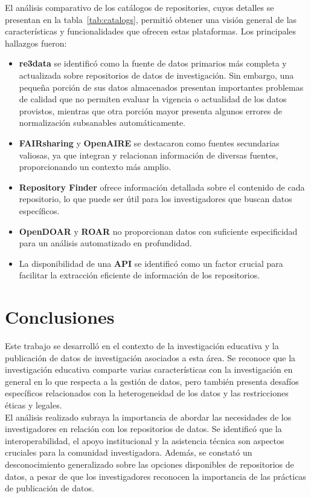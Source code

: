\documentclass[runningheads]{llncs}
\begin{document}
El análisis comparativo de los catálogos de repositories, cuyos detalles se presentan en la tabla~\ref{tab:catalogs}, permitió obtener una visión general de las características y funcionalidades que ofrecen estas plataformas. Los principales hallazgos fueron:
\begin{itemize}
    \item \textbf{re3data} se identificó como la fuente de datos primarios más completa y actualizada sobre repositorios de datos de investigación. Sin embargo, una pequeña porción de sus datos almacenados presentan importantes problemas de calidad que no permiten evaluar la vigencia o actualidad de los datos provistos, mientras que otra porción mayor presenta algunos errores de normalización subsanables automáticamente.
    \item \textbf{FAIRsharing} y \textbf{OpenAIRE} se destacaron como fuentes secundarias valiosas, ya que integran y relacionan información de diversas fuentes, proporcionando un contexto más amplio.
    \item \textbf{Repository Finder} ofrece información detallada sobre el contenido de cada repositorio, lo que puede ser útil para los investigadores que buscan datos específicos.
    \item \textbf{OpenDOAR} y \textbf{ROAR} no proporcionan datos con suficiente especificidad para un análisis automatizado en profundidad.
    \item La disponibilidad de una \textbf{API} se identificó como un factor crucial para facilitar la extracción eficiente de información de los repositorios.
\end{itemize}

\section{Conclusiones}

Este trabajo se desarrolló en el contexto de la investigación educativa y la publicación de datos de investigación asociados a esta área. Se reconoce que la investigación educativa comparte varias características con la investigación en general en lo que respecta a la gestión de datos, pero también presenta desafíos específicos relacionados con la heterogeneidad de los datos y las restricciones éticas y legales.\\

El análisis realizado subraya la importancia de abordar las necesidades de los investigadores en relación con los repositorios de datos. Se identificó que la interoperabilidad, el apoyo institucional y la asistencia técnica son aspectos cruciales para la comunidad investigadora. Además, se constató un desconocimiento generalizado sobre las opciones disponibles de repositorios de datos, a pesar de que los investigadores reconocen la importancia de las prácticas de publicación de datos.\\
\end{document}
